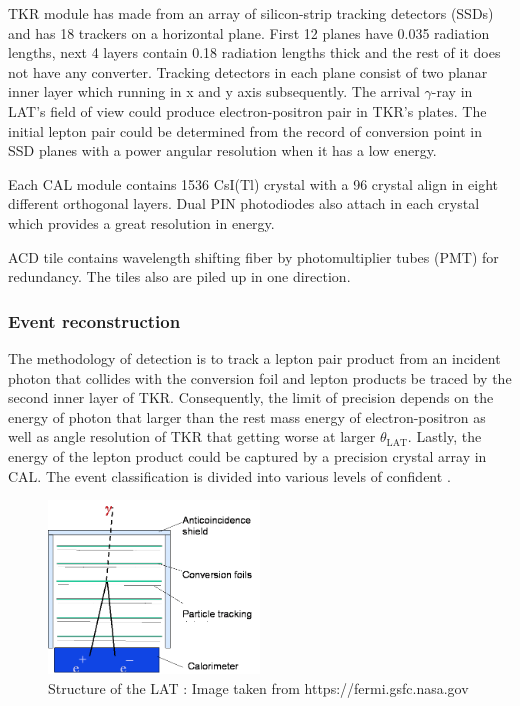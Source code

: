 \par TKR module has made from an array of silicon-strip tracking detectors (SSDs) and has 18 trackers on a horizontal plane. First 12 planes have 0.035 radiation lengths, next 4 layers contain 0.18 radiation lengths thick and the rest of it does not have any converter.
Tracking detectors in each plane consist of two planar inner layer which running in x and y axis subsequently. The arrival $\gamma$-ray in LAT's field of view could produce electron-positron pair in TKR's plates.
The initial lepton pair could be determined from the record of conversion point in SSD planes with a power angular resolution when it has a low energy.

\par Each CAL module contains 1536 CsI(Tl) crystal with a 96 crystal align in eight different orthogonal layers.
Dual PIN photodiodes also attach in each crystal which provides a great resolution in energy.

\par ACD tile contains wavelength shifting fiber by photomultiplier tubes (PMT) for redundancy. 
The tiles also are piled up in one direction.


\subsubsection*{Event reconstruction}
The methodology of detection is to track a lepton pair product from an incident photon that collides with the conversion foil and lepton products be traced by the second inner layer of TKR.
Consequently, the limit of precision depends on the energy of photon that larger than the rest mass energy of electron-positron as well as angle resolution of TKR that getting worse at larger $\theta_\text{LAT}$.
Lastly, the energy of the lepton product could be captured by a precision crystal array in CAL. The event classification is divided into various levels of confident \cite{FermiDetail,Atwood:2013rka}.


\begin{figure}[h!]
  \centering
    \includegraphics[width=0.5\textwidth]{img/LATMethodology}
    \caption{Structure of the LAT : Image taken from https://fermi.gsfc.nasa.gov}
  \end{figure}
